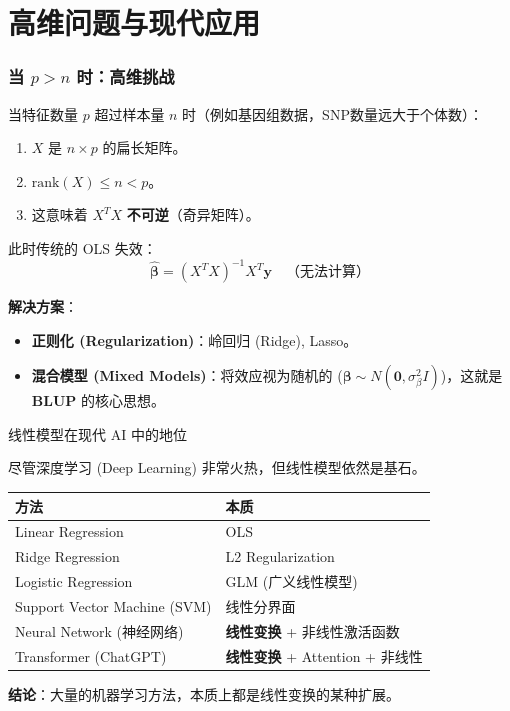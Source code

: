 
\section[高维问题]{高维问题与现代应用}


\begin{frame}
\frametitle{当 $p > n$ 时：高维挑战}

当特征数量 $p$ 超过样本量 $n$ 时（例如基因组数据，SNP数量远大于个体数）：
\begin{enumerate}
    \item $X$ 是 $n \times p$ 的扁长矩阵。
    \item $\text{rank}(X) \le n < p$。
    \item 这意味着 $X^T X$ \textbf{不可逆}（奇异矩阵）。
\end{enumerate}

\vspace{1em}
此时传统的 OLS 失效：
\[
\hat{\boldsymbol{\beta}} = (X^T X)^{-1} X^T \mathbf{y} \quad \text{（无法计算）}
\]

\textbf{解决方案}：
\begin{itemize}
    \item \textbf{正则化 (Regularization)}：岭回归 (Ridge), Lasso。
    \item \textbf{混合模型 (Mixed Models)}：将效应视为随机的 ($\boldsymbol{\beta} \sim N(\mathbf{0}, \sigma_\beta^2 I)$)，这就是 \textbf{BLUP} 的核心思想。
\end{itemize}

\end{frame}

\begin{frame}{线性模型在现代 AI 中的地位}

尽管深度学习 (Deep Learning) 非常火热，但线性模型依然是基石。

\begin{table}
\centering
\begin{tabular}{l l}
\toprule
\textbf{方法} & \textbf{本质} \\
\midrule
Linear Regression & OLS \\
Ridge Regression & L2 Regularization \\
Logistic Regression & GLM (广义线性模型) \\
Support Vector Machine (SVM) & 线性分界面 \\
Neural Network (神经网络) & \textbf{线性变换} + 非线性激活函数 \\
Transformer (ChatGPT) & \textbf{线性变换} + Attention + 非线性 \\
\bottomrule
\end{tabular}
\end{table}

\textbf{结论}：大量的机器学习方法，本质上都是线性变换的某种扩展。

\end{frame}

